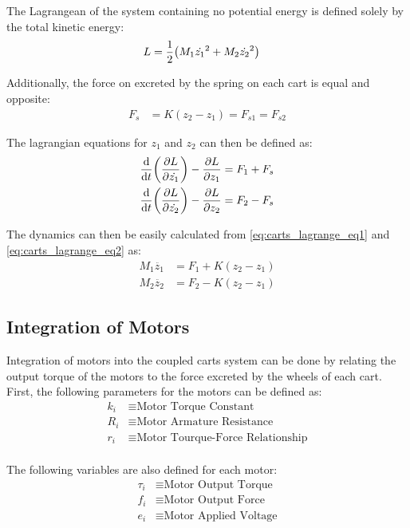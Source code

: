 \documentclass[]{article}
\begin{document}
		The Lagrangean of the system containing no potential energy is defined solely by the total kinetic energy:
		\begin{align}
			L &= \frac{1}{2} \qty(M_1 \dot{z_1}^2 + M_2 \dot{z_2}^2) \label{eq:carts_lagrange}
		\end{align}
		
		Additionally, the force on excreted by the spring on each cart is equal and opposite:
		\begin{align}
			F_s &= K(z_2 - z_1) = F_{s1} = F_{s2} \label{eq:spring_force}
		\end{align}
		
		The lagrangian equations for $z_1$ and $z_2$ can then be defined as:
		\begin{align}
			\dv{t}\qty(\pdv{L}{\dot{z_1}}) - \pdv{L}{z_1} &= F_1 + F_s \label{eq:carts_lagrange_eq1}\\
			\dv{t}\qty(\pdv{L}{\dot{z_2}}) - \pdv{L}{z_2} &= F_2 - F_s \label{eq:carts_lagrange_eq2}
		\end{align}	
		
		The dynamics can then be easily calculated from \eqref{eq:carts_lagrange_eq1} and \eqref{eq:carts_lagrange_eq2} as:
		\begin{align}
			M_1 \ddot{z_1} &= F_1 + K(z_2 - z_1) \label{eq:carts_state_eq1}\\
			M_2 \ddot{z_2} &= F_2 - K(z_2 - z_1) \label{eq:carts_state_eq2}
		\end{align}
		
	\subsection{Integration of Motors}
		Integration of motors into the coupled carts system can be done by relating the output torque of the motors to the force excreted by the wheels of each cart.\\
		
		First, the following parameters for the motors can be defined as:
		\begin{align*}
			k_i &\equiv \text{Motor Torque Constant}\\
			R_i &\equiv \text{Motor Armature Resistance}\\
			r_i &\equiv \text{Motor Tourque-Force Relationship}\\
		\end{align*}
		
		The following variables are also defined for each motor:
		\begin{align*}
			\tau_i &\equiv \text{Motor Output Torque}\\
			f_i &\equiv \text{Motor Output Force}\\
			e_i &\equiv \text{Motor Applied Voltage}
		\end{align*}
		
\end{document}
